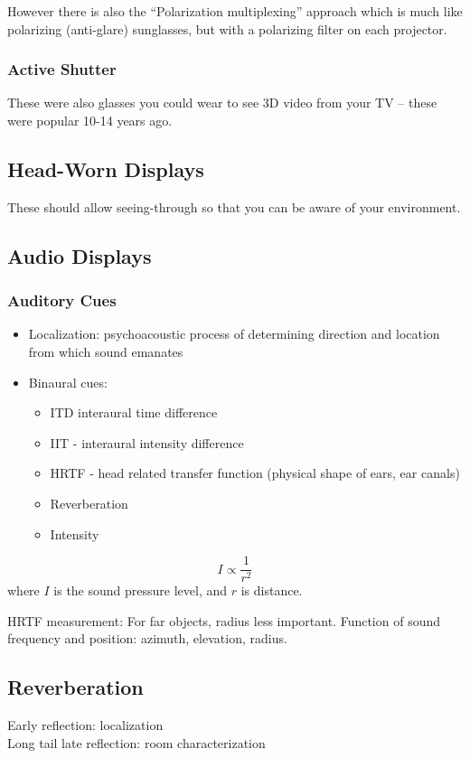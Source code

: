 However there is also the ``Polarization multiplexing'' approach which is much like polarizing (anti-glare) sunglasses, but with a polarizing filter on each projector.

\subsubsection{Active Shutter}
These were also glasses you could wear to see 3D video from your TV -- these were popular 10-14 years ago.

\subsection{Head-Worn Displays}
These should allow seeing-through so that you can be aware of your environment.

\subsection{Audio Displays}
\subsubsection{Auditory Cues}
\begin{itemize}
    \item Localization: psychoacoustic process of determining direction and location from
which sound emanates
\item Binaural cues:
  \begin{itemize}
    \item ITD interaural time difference
    \item IIT - interaural intensity difference
    \item HRTF - head related transfer function (physical shape of ears, ear canals)
    \item Reverberation
    \item Intensity
  \end{itemize}
\end{itemize}

\[
I \propto \frac{1}{r^2}
\]
where $I$ is the sound pressure level, and $r$ is distance.

HRTF measurement: For far objects, radius less
important. Function of sound frequency and
position: azimuth, elevation,
radius.

\subsection{Reverberation}
Early reflection: localization\\
Long tail late reflection: room characterization

